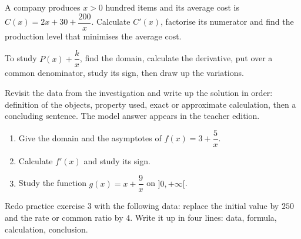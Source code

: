 \begin{activite}
A company produces $x>0$ hundred items and its average cost is $C(x)=2x+30+\dfrac{200}{x}$. Calculate $C'(x)$, factorise its numerator and find the production level that minimises the average cost.

\end{activite}

\begin{traceecrite}To study $P(x)+\dfrac{k}{x}$, find the domain, calculate the derivative, put over a common denominator, study its sign, then draw up the variations.\end{traceecrite}

\begin{exemple}
Revisit the data from the investigation and write up the solution in order: definition of the objects, property used, exact or approximate calculation, then a concluding sentence. The model answer appears in the teacher edition.
\end{exemple}

\begin{exercice}[-- essential]
\begin{enumerate}\item Give the domain and the asymptotes of $f(x)=3+\dfrac{5}x$.\item Calculate $f'(x)$ and study its sign.\item Study the function $g(x)=x+\dfrac{9}x$ on $]0,+\infty[$.\end{enumerate}
\end{exercice}


\begin{dm}Redo practice exercise 3 with the following data: replace the initial value by $250$ and the rate or common ratio by $4$. Write it up in four lines: data, formula, calculation, conclusion.\end{dm}

